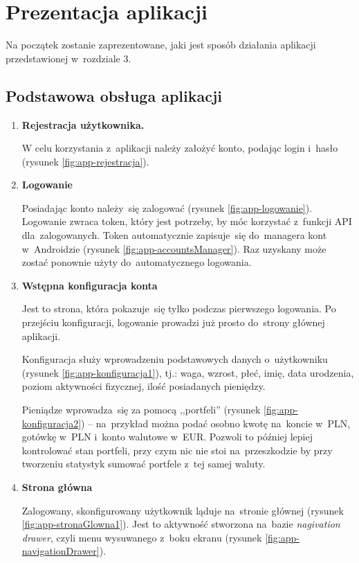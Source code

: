 \documentclass[12pt,a4paper,twoside,titlepage,openright]{book}
\begin{document}
\section{Prezentacja aplikacji}

Na początek zostanie zaprezentowane, jaki jest sposób działania aplikacji przedstawionej w~rozdziale 3.

\subsection{Podstawowa obsługa aplikacji}

\begin{enumerate}
\item \textbf{Rejestracja użytkownika.} 

W celu korzystania z~aplikacji należy założyć konto, podając login i~hasło (rysunek \ref{fig:app-rejestracja}).
\item \textbf{Logowanie} 

Posiadając konto należy~się zalogować (rysunek \ref{fig:app-logowanie}). Logowanie zwraca token, który jest potrzeby, by móc korzystać z~funkcji API dla~zalogowanych. Token automatycznie zapisuje~się do~managera kont w~Androidzie (rysunek \ref{fig:app-accountsManager}). Raz uzyskany może zostać ponownie użyty do~automatycznego logowania.
\item \textbf{Wstępna konfiguracja konta} 

Jest to strona, która pokazuje~się tylko podczas pierwszego logowania. Po przejściu konfiguracji, logowanie prowadzi już prosto do~strony głównej aplikacji.

Konfiguracja służy wprowadzeniu podstawowych danych o~użytkowniku (rysunek \ref{fig:app-konfiguracja1}), tj.: waga, wzrost, płeć, imię, data urodzenia, poziom aktywności fizycznej, ilość posiadanych pieniędzy. 

Pieniądze wprowadza~się za pomocą ,,portfeli'' (rysunek \ref{fig:app-konfiguracja2}) -- na~przykład można podać osobno kwotę na~koncie w~PLN, gotówkę w~PLN i~konto walutowe w~EUR. Pozwoli to później lepiej kontrolować stan portfeli, przy czym nic nie stoi na~przeszkodzie by przy tworzeniu statystyk sumować portfele z~tej samej waluty.

\item \textbf{Strona główna}

Zalogowany, skonfigurowany użytkownik ląduje na~stronie głównej (rysunek \ref{fig:app-stronaGlowna1}). Jest to aktywność stworzona na~bazie \textit{nagivation drawer}, czyli menu wysuwanego z~boku ekranu (rysunek \ref{fig:app-navigationDrawer}). 


\end{enumerate}
\end{document}
